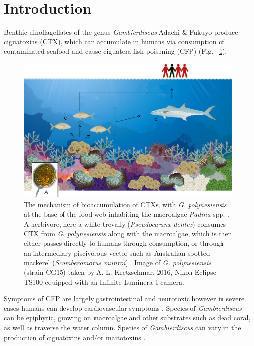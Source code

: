 \documentclass[12pt]{article}
\begin{document}
\newpage
\section*{Introduction}
\FloatBarrier
Benthic dinoflagellates of the genus \emph{Gambierdiscus} Adachi \& Fukuyo produce ciguatoxins (CTX), which can accumulate in humans via consumption of contaminated seafood and cause ciguatera fish poisoning (CFP) (Fig. ~\ref{fig:bioaccom}). 
\begin{figure} 
\includegraphics[scale=.55]{Hero_qpcr-figs/CFP-diagram.png} 
\caption{The mechanism of bioaccumulation of CTXs, with \emph{G. polynesiensis} at the base of the food web inhabiting the macroalgae \emph{Padina} spp. \cite{padina}. 
A herbivore, here a white trevally (\emph{Pseudocaranx dentex}) \cite{trevally} consumes CTX from \emph{G. polynesiensis} along with the macroalgae, which is then either passes directly to humans through consumption, or through an intermediary piscivorous vector such as Australian spotted mackerel (\emph{Scomberomorus munroi}) \cite{mackerel}. 
Image of \emph{G. polynesiensis} (strain CG15) taken by A. L. Kretzschmar, 2016, Nikon Eclipse TS100 equipped with an Infinite Luminera 1 camera.} 
\label{fig:bioaccom}
\end{figure} 
Symptoms of CFP are largely gastrointestinal and neurotoxic however in severe cases humans can develop cardiovascular symptoms \citep{sims1987theoretical}. 
Species of \emph{Gambierdiscus} can be epiphytic, growing on macroalgae and other substrates such as dead coral, as well as traverse the water column. 
Species of \textit{Gambierdiscus} can vary in the production of ciguatoxins and/or maitotoxins \citep{chinain2010ciguatera,kohli2014high}. 
\end{document}
